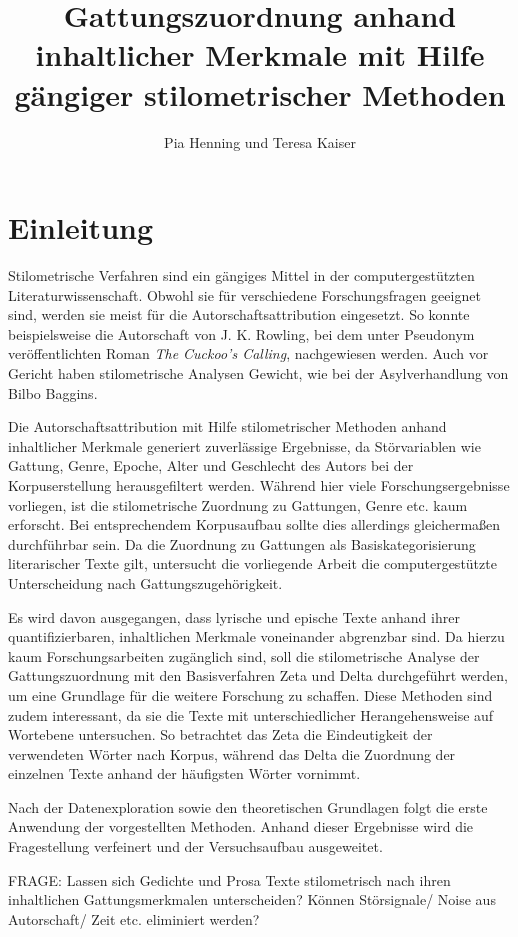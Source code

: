 \documentclass[a4paper,10p]{article}
\title{Gattungszuordnung anhand inhaltlicher Merkmale mit Hilfe gängiger stilometrischer Methoden}
\author{Pia Henning und Teresa Kaiser}
\begin{document}
\maketitle
\tableofcontents
\newpage
\listoffigures
\newpage
\section{Einleitung}
Stilometrische Verfahren sind ein gängiges Mittel in der computergestützten Literaturwissenschaft. Obwohl sie für verschiedene Forschungsfragen geeignet sind, werden sie meist für die Autorschaftsattribution eingesetzt. So konnte beispielsweise die Autorschaft von J. K. Rowling, bei dem unter Pseudonym veröffentlichten Roman \emph{The Cuckoo's Calling}, nachgewiesen werden. Auch vor Gericht haben stilometrische Analysen Gewicht, wie bei der Asylverhandlung von \glqq Bilbo Baggins\grqq \citep{Juola2015}.

Die Autorschaftsattribution mit Hilfe stilometrischer Methoden anhand inhaltlicher Merkmale generiert zuverlässige Ergebnisse, da Störvariablen wie Gattung, Genre, Epoche, Alter und Geschlecht des Autors bei der Korpuserstellung herausgefiltert werden. Während hier viele Forschungsergebnisse vorliegen, ist die stilometrische Zuordnung zu Gattungen, Genre etc. kaum erforscht. Bei ent\-sprech\-en\-dem Korpusaufbau sollte dies allerdings gleichermaßen durchführbar sein. Da die Zuordnung zu Gattungen als Basiskategorisierung literarischer Texte gilt, untersucht die vorliegende Arbeit die computergestützte Unterscheidung nach Gattungszugehörigkeit. 

Es wird davon ausgegangen, dass lyrische und epische Texte anhand ihrer quantifizierbaren, inhaltlichen Merkmale voneinander abgrenzbar sind. Da hierzu kaum Forschungsarbeiten zugänglich sind, soll die stilometrische Analyse der Gattungszuordnung mit den Basisverfahren Zeta und Delta durchgeführt werden, um eine Grundlage für die weitere Forschung zu schaffen. Diese Methoden sind zudem interessant, da sie die Texte mit unterschiedlicher Herangehensweise auf Wortebene untersuchen. So betrachtet das Zeta die Eindeutigkeit der verwendeten Wörter nach Korpus, während das Delta die Zuordnung der einzelnen Texte anhand der häufigsten Wörter vornimmt. 

Nach der Datenexploration sowie den theoretischen Grundlagen folgt die erste Anwendung der vorgestellten Methoden. Anhand dieser Ergebnisse wird die Fragestellung verfeinert und der Versuchsaufbau ausgeweitet.

FRAGE:   Lassen sich Gedichte und Prosa Texte stilometrisch nach ihren inhaltlichen Gattungsmerkmalen unterscheiden? Können Störsignale/ Noise aus Autorschaft/ Zeit etc. eliminiert werden?
\end{document}
